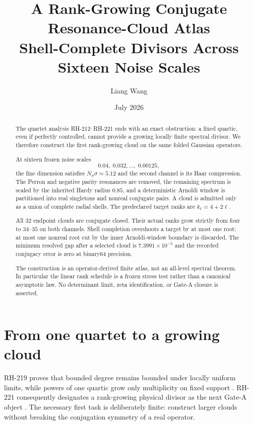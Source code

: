\documentclass[11pt]{article}
\title{A Rank-Growing Conjugate Resonance-Cloud Atlas\\
\large Shell-Complete Divisors Across Sixteen Noise Scales}
\author{Liang Wang}
\date{July 2026}
\theoremstyle{remark}\newtheorem{remark}[theorem]{Remark}
\begin{document}
\maketitle

\begin{abstract}
The quartet analysis RH-212--RH-221 ends with an exact obstruction: a fixed
quartic, even if perfectly controlled, cannot provide a growing locally finite
spectral divisor. We therefore construct the first rank-growing cloud on the
same folded Gaussian operators.

At sixteen frozen noise scales
\[
 0.04,\;0.032,\ldots,\;0.00125,
\]
the fine dimension satisfies $N_\sigma\sigma\simeq5.12$ and the second channel
is its Haar compression. The Perron and negative parity resonances are
removed, the remaining spectrum is scaled by the inherited Hardy radius
$0.85$, and a deterministic Arnoldi window is partitioned into real
singletons and nonreal conjugate pairs. A cloud is admitted only as a union
of complete radial shells. The predeclared target ranks are
$k_\ell=4+2\ell$.

All 32 endpoint clouds are conjugate closed. Their actual ranks grow
strictly from four to $34$--$35$ on both channels. Shell completion overshoots
a target by at most one root; at most one nonreal root cut by the inner
Arnoldi-window boundary is discarded. The minimum resolved gap after a
selected cloud is $7.3991\times10^{-5}$ and the recorded conjugacy error is
zero at binary64 precision.

The construction is an operator-derived finite atlas, not an all-level
spectral theorem. In particular the linear rank schedule is a frozen stress
test rather than a canonical asymptotic law. No determinant limit, zeta
identification, or Gate-A closure is asserted.
\end{abstract}

\section{From one quartet to a growing cloud}

RH-219 proves that bounded degree remains bounded under locally uniform
limits, while powers of one quartic grow only multiplicity on fixed support
\citep{WangRH219}. RH-221 consequently designates a rank-growing physical
divisor as the next Gate-A object \citep{WangRH221}. The necessary first task
is deliberately finite: construct larger clouds without breaking the
conjugation symmetry of a real operator.
\end{document}
